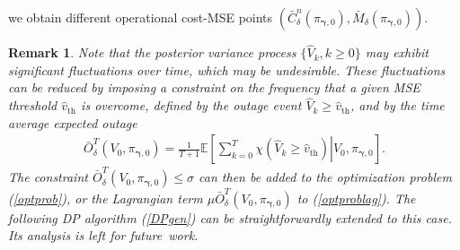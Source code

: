 \documentclass[10pt,twocolumn,twoside]{IEEEtran}
\theoremstyle{plain}
\newtheorem{remark}{Remark}
\begin{document}
we obtain different operational cost-MSE points $(\bar C_{\delta}^{n}(\pi_{\boldsymbol\gamma,0}),\bar M_{\delta}(\pi_{\boldsymbol\gamma,0}))$.
\vspace{-3mm}
\begin{remark}
\label{remoutage}
Note that the posterior variance process $\{\hat V_k,k{\geq}0\}$ may exhibit significant fluctuations over time, which may be undesirable. 
These fluctuations can be reduced by imposing a constraint on the frequency that a given MSE threshold $\hat v_{\mathrm{th}}$ is overcome,
defined by the \emph{outage} event $\hat V_k\geq\hat v_{\mathrm{th}}$, and by the time average expected outage
\begin{align}
\bar O_{\delta}^{T}(V_0,\pi_{\boldsymbol\gamma,0})=\frac{1}{T+1}
\mathbb E\left[\left.\sum_{k=0}^T\chi(\hat V_k\geq\hat v_{\mathrm{th}})\right|V_0,\pi_{\boldsymbol\gamma,0}\right].
\end{align}
The constraint $\bar O_{\delta}^{T}(V_0,\pi_{\boldsymbol\gamma,0}){\leq}\sigma$
can then be added to the optimization problem (\ref{optprob}), or the Lagrangian term $\mu \bar O_{\delta}^{T}(V_0,\pi_{\boldsymbol\gamma,0})$
to  (\ref{optproblag}).
The following DP algorithm (\ref{DPgen}) can be straightforwardly extended to this case. Its analysis is left for future~work.
\end{remark}
\vspace{-0.3cm}
\end{document}
